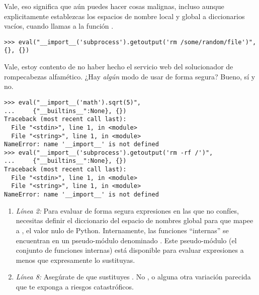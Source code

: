 Vale, eso significa que aún puedes hacer cosas malignas, incluso aunque explicitamente establezcas los espacios de nombre local y global a diccionarios vacíos, cuando llamas a la función .

\noindent\begin{minipage}{\textwidth}
\begin{lstlisting}[mathescape=True]
>>> eval("__import__('subprocess').getoutput('rm /some/random/file')", {}, {})
\end{lstlisting}
\end{minipage}

Vale, estoy contento de no haber hecho el servicio web del solucionador de rompecabezas alfamético. ¿Hay \emph{algún} modo de usar  de forma segura? Bueno, sí y no.

\noindent\begin{minipage}{\textwidth}
\begin{lstlisting}[mathescape=True]
>>> eval("__import__('math').sqrt(5)",
...     {"__builtins__":None}, {})
Traceback (most recent call last):
  File "<stdin>", line 1, in <module>
  File "<string>", line 1, in <module>
NameError: name '__import__' is not defined
>>> eval("__import__('subprocess').getoutput('rm -rf /')",
...     {"__builtins__":None}, {})
Traceback (most recent call last):
  File "<stdin>", line 1, in <module>
  File "<string>", line 1, in <module>
NameError: name '__import__' is not defined
\end{lstlisting}
\end{minipage}

\begin{enumerate}

\item \emph{Línea 2:} Para evaluar de forma segura expresiones en las que no confíes, necesitas definir el diccionario del espacio de nombres global para que mapee  a , el valor nulo de Python. Internamente, las funciones ``internas'' se encuentran en un pseudo-módulo denominado . Este pseudo-módulo (el conjunto de funciones internas) está disponible para evaluar expresiones a menos que expresamente lo sustituyas.

\item \emph{Línea 8:} Asegúrate de que sustituyes . No ,  o alguna otra variación parecida que te exponga a riesgos catastróficos.

\end{enumerate}

